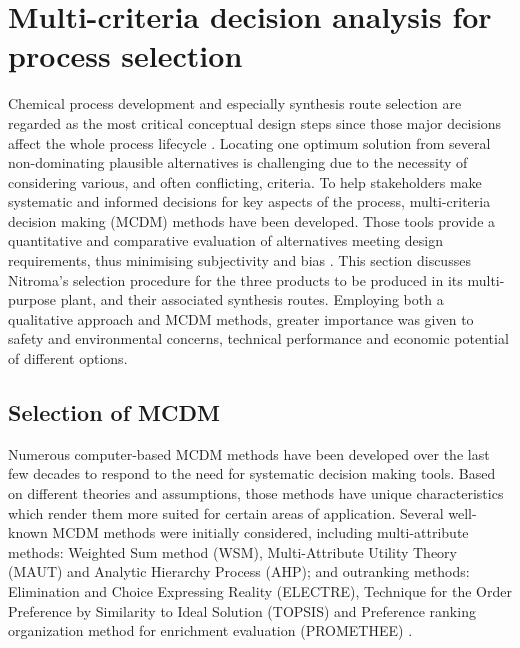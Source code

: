 \section{Multi-criteria decision analysis for process selection}

Chemical process development and especially synthesis route selection are regarded as the most critical conceptual design steps since those major decisions affect the whole process lifecycle \cite{cziner_evaluative_2005}. Locating one optimum solution from several non-dominating plausible alternatives is challenging due to the necessity of considering various, and often conflicting, criteria. To help stakeholders make systematic and informed decisions for key aspects of the process, multi-criteria decision making (MCDM) methods have been developed. Those tools provide a quantitative and comparative evaluation of alternatives meeting design requirements, thus minimising subjectivity and bias \cite{greco_multiple_2016}. 
This section discusses Nitroma's selection procedure for the three products to be produced in its multi-purpose plant, and their associated synthesis routes. Employing both a qualitative approach and MCDM methods, greater importance was given to safety and environmental concerns, technical performance and economic potential of different options.


\subsection{Selection of MCDM} %

Numerous computer-based MCDM methods have been developed over the last few decades to respond to the need for systematic decision making tools. Based on different theories and assumptions, those methods have unique characteristics which render them more suited for certain areas of application. Several well-known MCDM methods were initially considered, including multi-attribute methods: Weighted Sum method (WSM), Multi-Attribute Utility Theory (MAUT) and Analytic Hierarchy Process (AHP); and outranking methods: Elimination and Choice Expressing Reality (ELECTRE),  Technique for the Order Preference by Similarity to Ideal Solution (TOPSIS) and Preference ranking organization method for enrichment evaluation (PROMETHEE) \cite{hodgett_multi-criteria_2013}. 

